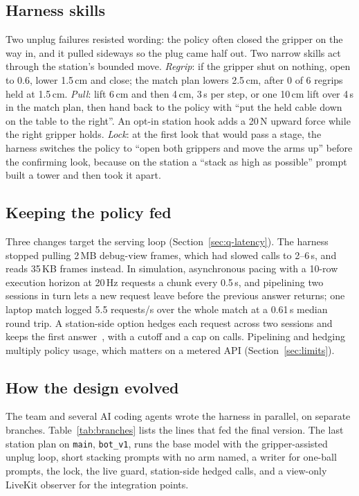 \documentclass[10pt]{article}
\begin{document}
\subsection{Harness skills}
Two unplug failures resisted wording: the policy often closed the gripper on the way in, and it pulled sideways so the
plug came half out. Two narrow skills act through the station's bounded move. \emph{Regrip}: if the gripper shut on
nothing, open to 0.6, lower 1.5\,cm and close; the match plan lowers 2.5\,cm, after 0 of 6 regrips held at 1.5\,cm. \emph{Pull}: lift 6\,cm
and then 4\,cm, 3\,s per step, or one 10\,cm lift over 4\,s in the match plan, then hand back to the
policy with ``put the held cable down on the table to the right''. An opt-in station hook adds a 20\,N upward force while
the right gripper holds. \emph{Lock}: at the first look that would pass a stage, the harness switches the policy to ``open
both grippers and move the arms up'' before the confirming look, because on the station a ``stack as high as possible''
prompt built a tower and then took it apart.

\subsection{Keeping the policy fed}
Three changes target the serving loop (Section~\ref{sec:q-latency}). The harness stopped pulling 2\,MB debug-view frames,
which had slowed calls to 2--6\,s, and reads 35\,KB frames instead. In simulation, asynchronous pacing with a 10-row
execution horizon at 20\,Hz requests a chunk every 0.5\,s, and pipelining two sessions in turn lets a new request leave
before the previous answer returns; one laptop match logged 5.5 requests/s over the whole match at a 0.61\,s median round trip. A station-side
option hedges each request across two sessions and keeps the first answer~\cite{dean2013tail}, with a cutoff and a cap on
calls. Pipelining and hedging multiply policy usage, which matters on a metered API (Section~\ref{sec:limits}).

\subsection{How the design evolved}
The team and several AI coding agents wrote the harness in parallel, on separate branches. Table~\ref{tab:branches}
lists the lines that fed the final version. The last station plan on \texttt{main}, \texttt{bot\_v1}, runs the base model with the
gripper-assisted unplug loop, short stacking prompts with no arm named, a writer for one-ball prompts, the lock, the live guard, station-side hedged
calls, and a view-only LiveKit observer for the integration points.
\end{document}
